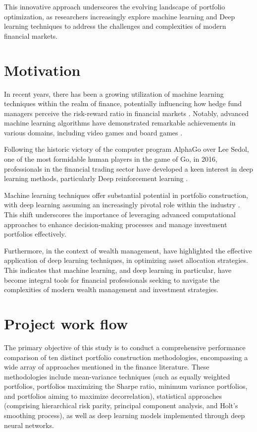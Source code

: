 This innovative approach underscores the evolving landscape of portfolio optimization, as researchers increasingly explore machine learning and Deep learning techniques to address the challenges and complexities of modern financial markets.

\section{Motivation}\label{I_Motivation}

In recent years, there has been a growing utilization of machine learning techniques within the realm of finance, potentially influencing how hedge fund managers perceive the risk-reward ratio in financial markets \citep{Wu20218119}. Notably, advanced machine learning algorithms have demonstrated remarkable achievements in various domains, including video games \citep{Mnih2015529} and board games \citep{Silver2016484}.

Following the historic victory of the computer program AlphaGo over Lee Sedol, one of the most formidable human players in the game of Go, in 2016, professionals in the financial trading sector have developed a keen interest in deep learning methods, particularly Deep reinforcement learning \citep{meng2019reinforcement}.

Machine learning techniques offer substantial potential in portfolio construction, with deep learning assuming an increasingly pivotal role within the industry \citep{Bartram20219}. This shift underscores the importance of leveraging advanced computational approaches to enhance decision-making processes and manage investment portfolios effectively.

Furthermore, in the context of wealth management, \citep{li2020asset} have highlighted the effective application of deep learning techniques, in optimizing asset allocation strategies. This indicates that machine learning, and deep learning in particular, have become integral tools for financial professionals seeking to navigate the complexities of modern wealth management and investment strategies.


\section{Project work flow}\label{I_workflow}
The primary objective of this study is to conduct a comprehensive performance comparison of ten distinct portfolio construction methodologies, encompassing a wide array of approaches mentioned in the finance literature. These methodologies include mean-variance techniques (such as equally weighted portfolios, portfolios maximizing the Sharpe ratio, minimum variance portfolios, and portfolios aiming to maximize decorrelation), statistical approaches (comprising hierarchical risk parity, principal component analysis, and Holt's smoothing process), as well as deep learning models implemented through deep neural networks.

